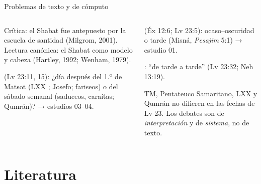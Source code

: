 \begin{frame}{Problemas de texto y de cómputo}
\begin{columns}[t,onlytextwidth]
\begin{column}{0.50\textwidth}\scriptsize
{} Crítica: el Shabat fue antepuesto por la escuela de santidad (Milgrom, 2001). Lectura canónica: el Shabat como modelo y cabeza (Hartley, 1992; Wenham, 1979).\par\medskip
{} (Lv 23:11, 15): ¿día después del 1.º de Matsot (LXX ; Josefo; fariseos) o del sábado semanal (saduceos, caraítas; Qumrán)? → estudios 03--04.
\end{column}
\begin{column}{0.48\textwidth}\scriptsize
{} (Éx 12:6; Lv 23:5): ocaso--oscuridad o tarde (Misná, \emph{Pesajim} 5:1) → estudio 01.\par\medskip
{}: ``de tarde a tarde'' (Lv 23:32; Neh 13:19).\par\medskip
\begin{tcolorbox}[colback=mostaza!12,colframe=mostaza!85!tierraroja,boxrule=0.6pt,arc=2pt,left=3pt,right=3pt,top=2pt,bottom=2pt,fonttitle=\bfseries\scriptsize,coltitle=caferojizo,colbacktitle=mostaza!30,title={Precisión textual}]
\scriptsize TM, Pentateuco Samaritano, LXX y Qumrán no difieren en las fechas de Lv 23. Los debates son de \emph{interpretación} y de \emph{sistema}, no de texto.
\end{tcolorbox}
\end{column}
\end{columns}
\end{frame}

\section{Literatura}


